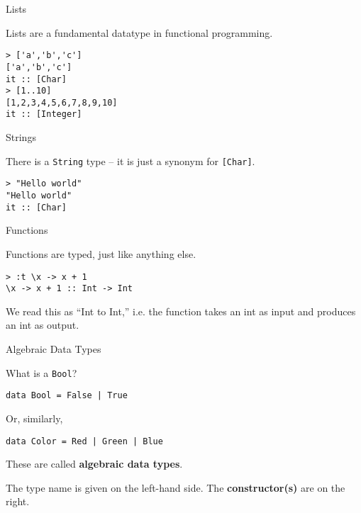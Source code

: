 %
\begin{frame}[fragile]{Lists}

Lists are a fundamental datatype in functional programming.

\begin{block}{}
\begin{verbatim}
> ['a','b','c']
['a','b','c']
it :: [Char]
> [1..10]
[1,2,3,4,5,6,7,8,9,10]
it :: [Integer]
\end{verbatim}
\end{block}

\end{frame}

%
\begin{frame}[fragile]{Strings}
  
There is a \texttt{String} type -- it is just a synonym for \texttt{[Char]}.

\begin{block}{}
\begin{verbatim}
> "Hello world"
"Hello world"
it :: [Char]
\end{verbatim}
\end{block}

\end{frame}

%
\begin{frame}[fragile]{Functions}
  
Functions are typed, just like anything else.

\begin{block}{}
\begin{verbatim}
> :t \x -> x + 1
\x -> x + 1 :: Int -> Int
\end{verbatim}
\end{block}

We read this as ``Int to Int,'' i.e. the function takes an int as input and
produces an int as output.

\end{frame}

%
\begin{frame}[fragile]{Algebraic Data Types}

What is a \texttt{Bool}?

\begin{block}{}
\begin{verbatim}
data Bool = False | True
\end{verbatim}
\end{block}

Or, similarly,

\begin{block}{}
\begin{verbatim}
data Color = Red | Green | Blue
\end{verbatim}
\end{block}

These are called \textbf{algebraic data types}.

The type name is given on the left-hand side. The \textbf{constructor(s)}
are on the right.

\end{frame}

